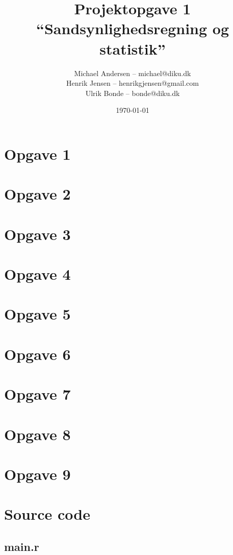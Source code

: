 \documentclass[a4paper, 10pt, final]{article}
\title{Projektopgave 1\\ ``Sandsynlighedsregning og statistik''}
\author{Michael Andersen -- michael@diku.dk \\ Henrik Jensen -- henrikgjensen@gmail.com \\ Ulrik Bonde -- bonde@diku.dk}
\date{\today}
\begin{document}
\maketitle
\thispagestyle{empty}

\section*{Opgave 1}


\section*{Opgave 2}


\section*{Opgave 3}


\section*{Opgave 4}


\section*{Opgave 5}


\section*{Opgave 6}


\section*{Opgave 7}


\section*{Opgave 8}


\section*{Opgave 9}


\newpage

\appendix

\section{Source code}
\subsection{main.r \label{app_source1}}

\end{document}
